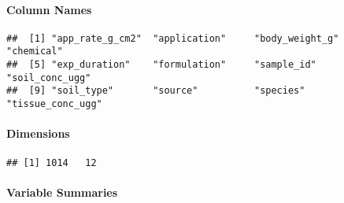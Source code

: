 \documentclass[
]{article}
\begin{document}
\hypertarget{column-names}{%
\paragraph{\texorpdfstring{\textbf{Column
Names}}{Column Names}}\label{column-names}}

\begin{verbatim}
##  [1] "app_rate_g_cm2"  "application"     "body_weight_g"   "chemical"       
##  [5] "exp_duration"    "formulation"     "sample_id"       "soil_conc_ugg"  
##  [9] "soil_type"       "source"          "species"         "tissue_conc_ugg"
\end{verbatim}

\hypertarget{dimensions}{%
\paragraph{\texorpdfstring{\textbf{Dimensions}}{Dimensions}}\label{dimensions}}

\begin{verbatim}
## [1] 1014   12
\end{verbatim}

\hypertarget{variable-summaries}{%
\paragraph{\texorpdfstring{\textbf{Variable
Summaries}}{Variable Summaries}}\label{variable-summaries}}
\end{document}
